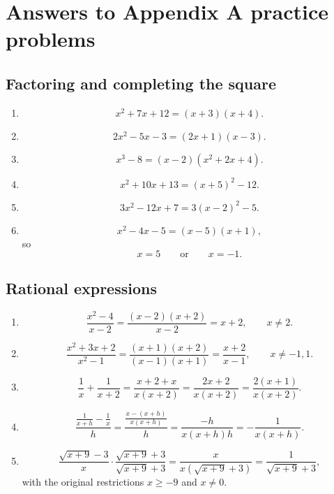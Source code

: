 \section*{Answers to Appendix A practice problems}
\label{ans:appendix-a-practice}

\subsection*{Factoring and completing the square}

\begin{enumerate}
\item
\[
x^2+7x+12=(x+3)(x+4).
\]

\item
\[
2x^2-5x-3=(2x+1)(x-3).
\]

\item
\[
x^3-8=(x-2)(x^2+2x+4).
\]

\item
\[
x^2+10x+13=(x+5)^2-12.
\]

\item
\[
3x^2-12x+7=3(x-2)^2-5.
\]

\item
\[
x^2-4x-5=(x-5)(x+1),
\]
so
\[
x=5
\qquad\text{or}\qquad
x=-1.
\]
\end{enumerate}

\subsection*{Rational expressions}

\begin{enumerate}
\item
\[
\frac{x^2-4}{x-2}
=
\frac{(x-2)(x+2)}{x-2}
=
x+2,
\qquad x\neq2.
\]

\item
\[
\frac{x^2+3x+2}{x^2-1}
=
\frac{(x+1)(x+2)}{(x-1)(x+1)}
=
\frac{x+2}{x-1},
\qquad x\neq -1,1.
\]

\item
\[
\frac{1}{x}+\frac{1}{x+2}
=
\frac{x+2+x}{x(x+2)}
=
\frac{2x+2}{x(x+2)}
=
\frac{2(x+1)}{x(x+2)}.
\]

\item
\[
\frac{\frac1{x+h}-\frac1x}{h}
=
\frac{\frac{x-(x+h)}{x(x+h)}}{h}
=
\frac{-h}{x(x+h)h}
=
-\frac1{x(x+h)}.
\]

\item
\[
\frac{\sqrt{x+9}-3}{x}
\cdot
\frac{\sqrt{x+9}+3}{\sqrt{x+9}+3}
=
\frac{x}{x(\sqrt{x+9}+3)}
=
\frac1{\sqrt{x+9}+3},
\]
with the original restrictions \(x\ge -9\) and \(x\neq0\).
\end{enumerate}

